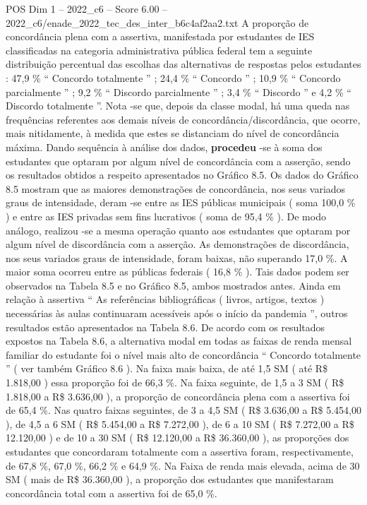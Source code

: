 \begin{textsample}{POS Dim 1 – 2022\_c6 – Score 6.00 – 2022\_c6/enade\_2022\_tec\_des\_inter\_b6c4af2aa2.txt}
A proporção de concordância plena com a assertiva, manifestada por estudantes de IES classificadas na categoria administrativa pública federal tem a seguinte distribuição percentual das escolhas das alternativas de respostas pelos estudantes : 47,9 \% “ Concordo totalmente ” ; 24,4 \% “ Concordo ” ; 10,9 \% “ Concordo parcialmente ” ; 9,2 \% “ Discordo parcialmente ” ; 3,4 \% “ Discordo ” e 4,2 \% “ Discordo totalmente ”.
Nota -se que, depois da classe modal, há uma queda nas frequências referentes aos demais níveis de concordância/discordância, que ocorre, mais nitidamente, à medida que estes se distanciam do nível de concordância máxima.
Dando sequência à análise dos dados, \textbf{procedeu} -se à soma dos estudantes que optaram por algum nível de concordância com a asserção, sendo os resultados obtidos a respeito apresentados no Gráfico 8.5.
Os dados do Gráfico 8.5 mostram que as maiores demonstrações de concordância, nos seus variados graus de intensidade, deram -se entre as IES públicas municipais ( soma 100,0 \% ) e entre as IES privadas sem fins lucrativos ( soma de 95,4 \% ).
De modo análogo, realizou -se a mesma operação quanto aos estudantes que optaram por algum nível de discordância com a asserção.
As demonstrações de discordância, nos seus variados graus de intensidade, foram baixas, não superando 17,0 \%.
A maior soma ocorreu entre as públicas federais ( 16,8 \% ).
Tais dados podem ser observados na Tabela 8.5 e no Gráfico 8.5, ambos mostrados antes.
Ainda em relação à assertiva “ As referências bibliográficas ( livros, artigos, textos ) necessárias às aulas continuaram acessíveis após o início da pandemia ”, outros resultados estão apresentados na Tabela 8.6.
De acordo com os resultados expostos na Tabela 8.6, a alternativa modal em todas as faixas de renda mensal familiar do estudante foi o nível mais alto de concordância “ Concordo totalmente ” ( ver também Gráfico 8.6 ).
Na faixa mais baixa, de até 1,5 SM ( até R\$ 1.818,00 ) essa proporção foi de 66,3 \%.
Na faixa seguinte, de 1,5 a 3 SM ( R\$ 1.818,00 a R\$ 3.636,00 ), a proporção de concordância plena com a assertiva foi de 65,4 \%.
Nas quatro faixas seguintes, de 3 a 4,5 SM ( R\$ 3.636,00 a R\$ 5.454,00 ), de 4,5 a 6 SM ( R\$ 5.454,00 a R\$ 7.272,00 ), de 6 a 10 SM ( R\$ 7.272,00 a R\$ 12.120,00 ) e de 10 a 30 SM ( R\$ 12.120,00 a R\$ 36.360,00 ), as proporções dos estudantes que concordaram totalmente com a assertiva foram, respectivamente, de 67,8 \%, 67,0 \%, 66,2 \% e 64,9 \%.
Na Faixa de renda mais elevada, acima de 30 SM ( mais de R\$ 36.360,00 ), a proporção dos estudantes que manifestaram concordância total com a assertiva foi de 65,0 \%.

\end{textsample}

